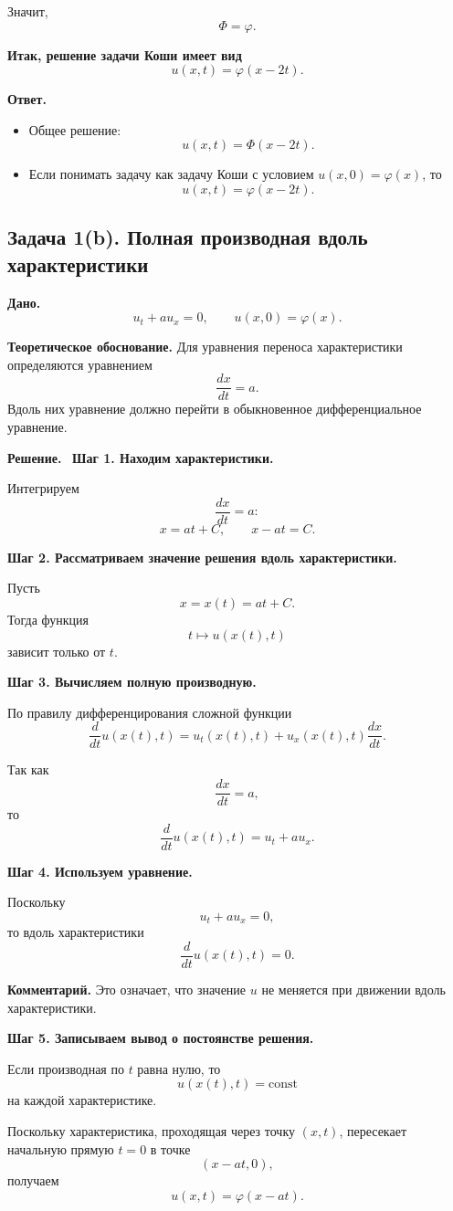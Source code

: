 \documentclass[a4paper,12pt]{article}
\newcommand{\Solution}{\textbf{Решение.}\ }
\begin{document}
Значит,
\[
\Phi=\varphi.
\]

\textbf{Итак, решение задачи Коши имеет вид}
\[
u(x,t)=\varphi(x-2t).
\]

\textbf{Ответ.}
\begin{itemize}
  \item Общее решение:
  \[
  u(x,t)=\Phi(x-2t).
  \]
  \item Если понимать задачу как задачу Коши с условием $u(x,0)=\varphi(x)$, то
  \[
  u(x,t)=\varphi(x-2t).
  \]
\end{itemize}

\subsection*{Задача 1(b). Полная производная вдоль характеристики}

\textbf{Дано.}
\[
u_t+a u_x=0,
\qquad
u(x,0)=\varphi(x).
\]

\textbf{Теоретическое обоснование.}
Для уравнения переноса характеристики определяются уравнением
\[
\frac{dx}{dt}=a.
\]
Вдоль них уравнение должно перейти в обыкновенное дифференциальное уравнение.

\Solution
\textbf{Шаг 1. Находим характеристики.}

Интегрируем
\[
\frac{dx}{dt}=a:
\]
\[
x=at+C,
\qquad
x-at=C.
\]

\textbf{Шаг 2. Рассматриваем значение решения вдоль характеристики.}

Пусть
\[
x=x(t)=at+C.
\]
Тогда функция
\[
t\longmapsto u(x(t),t)
\]
зависит только от $t$.

\textbf{Шаг 3. Вычисляем полную производную.}

По правилу дифференцирования сложной функции
\[
\frac{d}{dt}u(x(t),t)=u_t(x(t),t)+u_x(x(t),t)\frac{dx}{dt}.
\]

Так как
\[
\frac{dx}{dt}=a,
\]
то
\[
\frac{d}{dt}u(x(t),t)=u_t+a u_x.
\]

\textbf{Шаг 4. Используем уравнение.}

Поскольку
\[
u_t+a u_x=0,
\]
то вдоль характеристики
\[
\frac{d}{dt}u(x(t),t)=0.
\]

\textbf{Комментарий.} Это означает, что значение $u$ не меняется при движении вдоль характеристики.

\textbf{Шаг 5. Записываем вывод о постоянстве решения.}

Если производная по $t$ равна нулю, то
\[
u(x(t),t)=\mathrm{const}
\]
на каждой характеристике.

Поскольку характеристика, проходящая через точку $(x,t)$, пересекает начальную прямую $t=0$ в точке
\[
(x-at,0),
\]
получаем
\[
u(x,t)=\varphi(x-at).
\]
\end{document}

